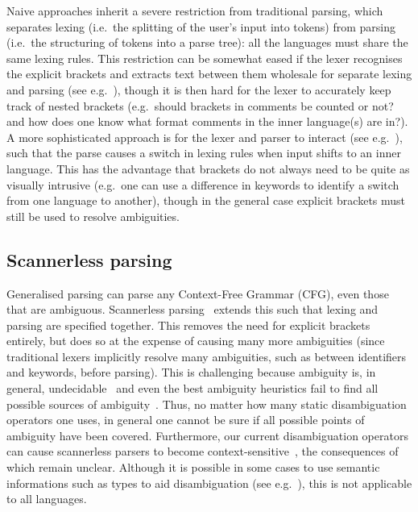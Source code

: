 \documentclass[sigplan,screen]{acmart}\settopmatter{printfolios=true,printccs=false,printacmref=false}
\begin{document}
Naive approaches inherit a severe restriction from traditional parsing, which
separates lexing (i.e.~the splitting of the user's input into tokens) from
parsing (i.e.~the structuring of tokens into a parse tree): all the languages
must share the same lexing rules. This restriction can be somewhat eased if the
lexer recognises the explicit brackets and extracts text between them wholesale
for separate lexing and parsing (see e.g.~\cite[p.~13-14]{tratt08domainspecific}),
though it is then hard for the lexer to accurately keep track of nested
brackets (e.g.~should brackets in comments be counted or not? and how does
one know what format comments in the inner language(s) are in?).  A
more sophisticated approach is for the lexer and parser to interact (see
e.g.~\cite{wyk07context}), such that the parse causes a switch in lexing rules
when input shifts to an inner language.
This has the advantage that brackets do not always need to be quite as visually
intrusive (e.g.~one can use a difference in keywords to identify a switch from
one language to another), though in the general case explicit brackets must still be
used to resolve ambiguities.


\subsection{Scannerless parsing}
\label{sec:scannerless}

Generalised parsing can parse any Context-Free Grammar (CFG), even those that
are ambiguous. Scannerless parsing~\cite{visser97scannerless} extends this such
that lexing and parsing are specified together. This removes the need for
explicit brackets entirely, but does so at the expense of causing many more
ambiguities (since traditional lexers implicitly resolve many ambiguities, such
as between identifiers and keywords, before parsing).
This is challenging because ambiguity is, in general,
undecidable~\cite{cantor62ambiguity} and even the best ambiguity heuristics fail
to find all possible sources of ambiguity~\cite{vasudevan13detecting}. Thus,
no matter how many static disambiguation operators one uses, in general one
cannot be sure if all possible points of ambiguity have been covered.
Furthermore, our current disambiguation operators can cause scannerless
parsers to become context-sensitive~\cite{eijck__lets_accept_rejects}, the
consequences of which remain unclear. Although it is possible in some cases
to use semantic informations such as types to aid disambiguation (see
e.g.~\cite{vinju05typedriven}), this is not applicable to all languages.
\end{document}
